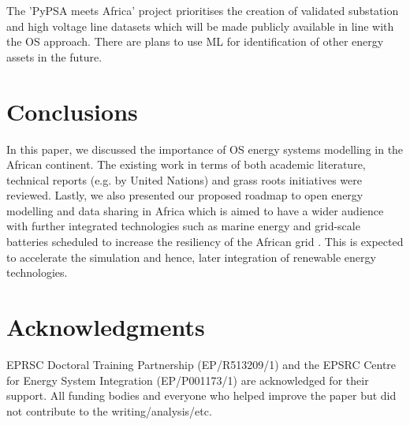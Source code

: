 \documentclass[conference, a4paper]{IEEEtran}
\begin{document}
The 'PyPSA meets Africa' project prioritises the creation of validated substation and high voltage line datasets which will be made publicly available in line with the OS approach. There are plans to use ML for identification of other energy assets in the future.

\section{Conclusions}
In this paper, we discussed the importance of OS energy systems modelling in the African continent. The existing work in terms of both academic literature, technical reports (e.g. by United Nations) and grass roots initiatives were reviewed. Lastly, we also presented our proposed roadmap to open energy modelling and data sharing in Africa which is aimed to have a wider audience with further integrated technologies such as marine energy and grid-scale batteries scheduled to increase the resiliency of the African grid \cite{}. This is expected to accelerate the simulation and hence, later integration of renewable energy technologies.

\section*{Acknowledgments}
EPRSC Doctoral Training Partnership (EP/R513209/1) and the EPSRC Centre for Energy System Integration (EP/P001173/1) are acknowledged for their support.
All funding bodies and everyone who helped improve the paper but did not contribute to the writing/analysis/etc.





\end{document}
